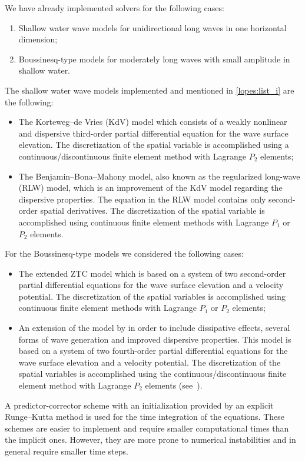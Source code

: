 We have already implemented solvers for the following cases:
\begin{enumerate}
\item \label{lopes:list_i} Shallow water wave models for
  unidirectional long waves in one horizontal dimension;
\item  Boussinesq-type models for moderately long
  waves with small amplitude in shallow water.
\end{enumerate}
The shallow water wave models implemented and mentioned in
\ref{lopes:list_i} are the following:
\begin{itemize}
\item The Korteweg--de Vries (KdV) model which consists of a weakly
  nonlinear and dispersive third-order partial differential equation
  for the wave surface elevation. The discretization of the spatial
  variable is accomplished using a continuous/discontinuous finite
  element method with Lagrange $P_2$ elements;
\item The Benjamin--Bona--Mahony model, also known as the regularized
  long-wave (RLW) model, which is an improvement of the KdV model
  regarding the dispersive properties.  The equation in the RLW model
  contains only second-order spatial derivatives. The discretization
  of the spatial variable is accomplished using continuous finite
  element methods with Lagrange $P_1$ or $P_2$ elements.
\end{itemize}
For the Boussinesq-type models we considered the following
cases:
\begin{itemize}
\item The extended ZTC model which is based on a system of two
  second-order partial differential equations for the wave surface
  elevation and a velocity potential. The discretization of the
  spatial variables is accomplished using continuous finite element
  methods with Lagrange $P_1$ or $P_2$ elements;
 \item An extension of the model by \citet{ChenLiu1994} in order to
   include dissipative effects, several forms of wave generation and
   improved dispersive properties. This model is based on a system of
   two fourth-order partial differential equations for the wave
   surface elevation and a velocity potential. The discretization of
   the spatial variables is accomplished using the
   continuous/discontinuous finite element method with Lagrange $P_2$
   elements (see~\citet{LopesPereiraTrabucho}).
\end{itemize}

A predictor-corrector scheme with an initialization provided by an
explicit Runge--Kutta method is used for the time integration of the
equations.  These schemes are easier to implement and require smaller
computational times than the implicit ones.  However, they are more
prone to numerical instabilities and in general require smaller time
steps.

